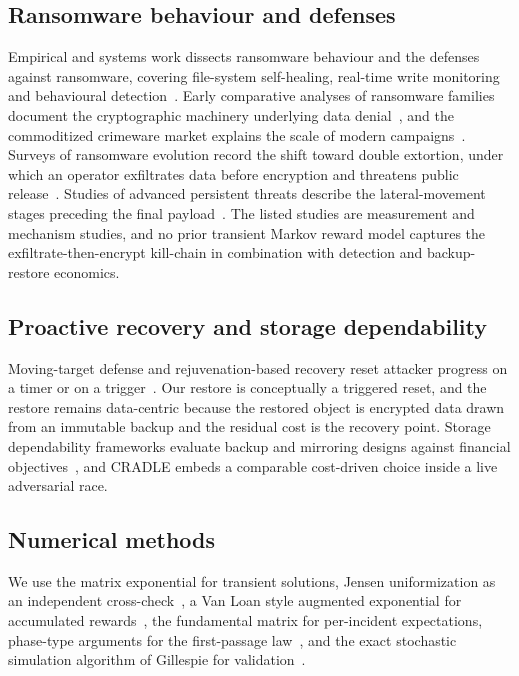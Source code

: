 \documentclass[journal]{IEEEtran}
\begin{document}
\subsection{Ransomware behaviour and defenses}
Empirical and systems work dissects ransomware behaviour and the defenses
against ransomware, covering file-system self-healing, real-time write
monitoring and behavioural detection~\cite{kharraz2015gordian,
continella2016shieldfs,kharraz2017redemption,beaman2021ransomware}. Early
comparative analyses of ransomware families document the cryptographic
machinery underlying data denial~\cite{gazet2010comparative}, and the
commoditized crimeware market explains the scale of modern
campaigns~\cite{sood2013crimeware}. Surveys of ransomware evolution record the
shift toward double extortion, under which an operator exfiltrates data before
encryption and threatens public release~\cite{razaulla2023age,
alrimy2018ransomware}. Studies of advanced persistent threats describe the
lateral-movement stages preceding the final payload~\cite{ussath2016apt}. The
listed studies are measurement and mechanism studies, and no prior transient
Markov reward model captures the exfiltrate-then-encrypt kill-chain in
combination with detection and backup-restore economics.

\subsection{Proactive recovery and storage dependability}
Moving-target defense and rejuvenation-based recovery reset attacker progress on
a timer or on a trigger~\cite{jajodia2011mtd,huang1995rejuvenation}. Our restore
is conceptually a triggered reset, and the restore remains data-centric because
the restored object is encrypted data drawn from an immutable backup and the
residual cost is the recovery point. Storage dependability frameworks evaluate
backup and mirroring designs against financial
objectives~\cite{keeton2004framework}, and CRADLE embeds a comparable
cost-driven choice inside a live adversarial race.

\subsection{Numerical methods}
We use the matrix exponential for transient solutions, Jensen uniformization as
an independent cross-check~\cite{reibman1988transient}, a Van Loan style
augmented exponential for accumulated
rewards~\cite{vanloan1978,moler2003nineteen}, the fundamental matrix for
per-incident expectations, phase-type arguments for the first-passage
law~\cite{latouche1999matrix}, and the exact stochastic simulation algorithm of
Gillespie for validation~\cite{gillespie1977exact}.
\end{document}
